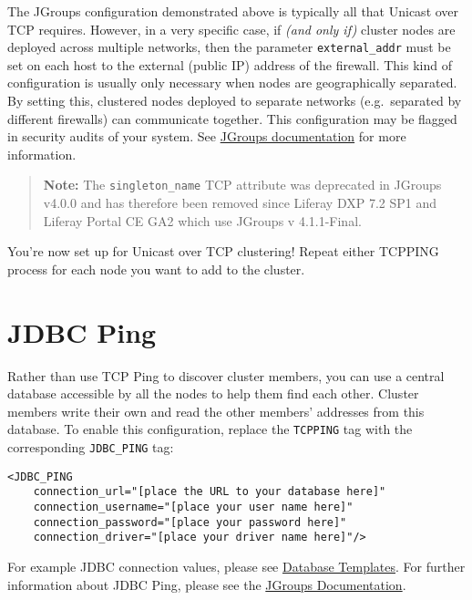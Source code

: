 The JGroups configuration demonstrated above is typically all that
Unicast over TCP requires. However, in a very specific case, if
\emph{(and only if)} cluster nodes are deployed across multiple
networks, then the parameter \texttt{external\_addr} must be set on each
host to the external (public IP) address of the firewall. This kind of
configuration is usually only necessary when nodes are geographically
separated. By setting this, clustered nodes deployed to separate
networks (e.g.~separated by different firewalls) can communicate
together. This configuration may be flagged in security audits of your
system. See
\href{http://www.jgroups.org/manual4/index.html\#_transport_protocols}{JGroups
documentation} for more information.

\begin{quote}
\textbf{Note:} The \texttt{singleton\_name} TCP attribute was deprecated
in JGroups v4.0.0 and has therefore been removed since Liferay DXP 7.2
SP1 and Liferay Portal CE GA2 which use JGroups v 4.1.1-Final.
\end{quote}

You're now set up for Unicast over TCP clustering! Repeat either TCPPING
process for each node you want to add to the cluster.

\section{JDBC Ping}\label{jdbc-ping}

Rather than use TCP Ping to discover cluster members, you can use a
central database accessible by all the nodes to help them find each
other. Cluster members write their own and read the other members'
addresses from this database. To enable this configuration, replace the
\texttt{TCPPING} tag with the corresponding \texttt{JDBC\_PING} tag:

\begin{verbatim}
<JDBC_PING
    connection_url="[place the URL to your database here]"
    connection_username="[place your user name here]"
    connection_password="[place your password here]"
    connection_driver="[place your driver name here]"/>
\end{verbatim}

For example JDBC connection values, please see
\href{/docs/7-2/deploy/-/knowledge_base/d/database-templates}{Database
Templates}. For further information about JDBC Ping, please see the
\href{http://www.jgroups.org/manual4/index.html\#DiscoveryProtocols}{JGroups
Documentation}.


